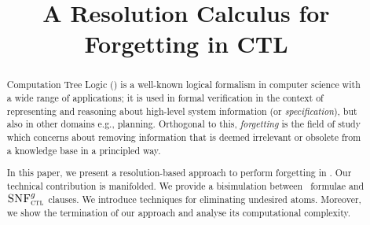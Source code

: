 \documentclass[letterpaper]{article}
\begin{document}
\newcommand{\CTLsnf}{{\textsc{SNF}_{\textsc{ctl}}^g}}
\newcommand{\ResC}{{\textsc{R}_{\textsc{ctl}}^{\succ, S}}}
\newcommand{\CTLforget}{{\textsc{F}_{\textsc{ctl}}}}
\newcommand{\Refine}{\textsc{Refine}}
\newcommand{\cf}{\textrm{cf.}}
\newcommand{\NEXP}{\textmd{\rm NEXP}}
\newcommand{\EXP}{\textmd{\rm EXP}}
\newcommand{\coNEXP}{\textmd{\rm co-NEXP}}
\newcommand{\NP}{\textmd{\rm NP}}
\newcommand{\coNP}{\textmd{\rm co-NP}}
\newcommand{\Pol}{\textmd{\rm P}}
\newcommand{\BH}[1]{\textmd{\rm BH}_{#1}}
\newcommand{\coBH}[1]{\textmd{\rm co-BH}_{#1}}
\newcommand{\Empty}{\emptyset}%
\newcommand{\NLOG}{\textmd{\rm NLOG}}
\newcommand{\DeltaP}[1]{\Delta_{#1}^{p}}
\newcommand{\PIP}[1]{\Pi_{#1}^{p}}
\newcommand{\SigmaP}[1]{\Sigma_{#1}^{p}}

%
\title{A Resolution Calculus for Forgetting in CTL}


\maketitle
\begin{abstract}
Computation Tree Logic (\CTL) is a well-known logical formalism in computer science with a wide range of applications; it is used  in formal verification in the context of representing and reasoning about high-level system information (or \emph{specification}), but also in other domains e.g., planning.  Orthogonal to this, \emph{forgetting} is the field of study which concerns about removing information that is deemed irrelevant or obsolete from a knowledge base in a principled way.

In this paper, we present a resolution-based approach to perform forgetting in \CTL.
Our technical contribution is manifolded. We provide a bisimulation between \CTL\ formulae and $\CTLsnf$ clauses. We introduce techniques for eliminating undesired atoms. Moreover, we show the termination of our approach and analyse its computational complexity. 
\end{abstract}
\end{document}
